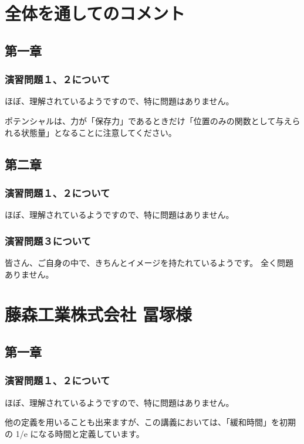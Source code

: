\documentclass[uplatex,dvipdfmx,a4paper,11pt]{jsreport}
\begin{document}
\section*{全体を通してのコメント}
\subsection*{第一章}
\subsubsection*{演習問題１、２について}
ほぼ、理解されているようですので、特に問題はありません。

ポテンシャルは、力が「保存力」であるときだけ「位置のみの関数として与えられる状態量」となることに注意してください。

\subsection*{第二章}
\subsubsection*{演習問題１、２について}
ほぼ、理解されているようですので、特に問題はありません。



\subsubsection*{演習問題３について}

皆さん、ご自身の中で、きちんとイメージを持たれているようです。
全く問題ありません。



\clearpage

\section*{藤森工業株式会社 冨塚様}
\subsection*{第一章}
\subsubsection*{演習問題１、２について}
ほぼ、理解されているようですので、特に問題はありません。

他の定義を用いることも出来ますが、この講義においては、「緩和時間」を初期の 1/e になる時間と定義しています。
\end{document}

